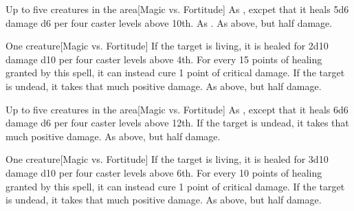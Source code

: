\spellrng{\rngclose}
\begin{spelltargets}{Up to five creatures in the area}[Magic vs. Fortitude]
    \spelleffect As , excpet that it heals 5d6 damage \add d6 per four caster levels above 10th.
    \spellsuccess As .
    \spellfailure As above, but half damage.
\end{spelltargets}

\spellrng{\rngclose}
\begin{spelltarget}{One creature}[Magic vs. Fortitude]
    \spelleffect If the target is living, it is healed for 2d10 damage \add d10 per four caster levels above 4th. For every 15 points of healing granted by this spell, it can instead cure 1 point of critical damage.
    \spellsuccess If the target is undead, it takes that much positive damage.
    \spellfailure As above, but half damage.
\end{spelltarget}

\begin{spelltargets}{Up to five creatures in the area}[Magic vs. Fortitude]
    \spelleffect As , except that it heals 6d6 damage \add d6 per four caster levels above 12th.
    \spellsuccess If the target is undead, it takes that much positive damage.
    \spellfailure As above, but half damage.
\end{spelltargets}

\spellrng{\rngclose}
\begin{spelltarget}{One creature}[Magic vs. Fortitude]
    \spelleffect If the target is living, it is healed for 3d10 damage \add d10 per four caster levels above 6th. For every 10 points of healing granted by this spell, it can instead cure 1 point of critical damage.
    \spellsuccess If the target is undead, it takes that much positive damage.
    \spellfailure As above, but half damage.
\end{spelltarget}

